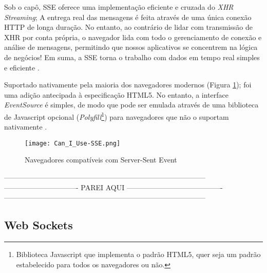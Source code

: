 \begin{citacao}
	Sob o capô, SSE oferece uma implementação eficiente e cruzada do \emph{XHR Streaming}; A entrega real das mensagens é feita através de uma única conexão HTTP de longa duração. No entanto, ao contrário de lidar com transmissão de XHR por conta própria, o navegador lida com todo o gerenciamento de conexão e análise de mensagens, permitindo que nossos aplicativos se concentrem na lógica de negócios! Em suma, a SSE torna o trabalho com dados em tempo real simples e eficiente \cite[P.~279]{grigorik2013high}.
\end{citacao}

Suportado nativamente pela maioria dos navegadores modernos (Figura \ref{fig:sse}); foi uma adição antecipada à especificação HTML5. No entanto, a interface \emph{EventSource} é simples, de modo que pode ser emulada através de uma biblioteca de Javascript opcional (\emph{Polyfill}\footnote{Biblioteca Javascript que implementa o padrão HTML5, quer seja um padrão estabelecido para todos os navegadores ou não.}) para navegadores que não o suportam nativamente \cite{grigorik2013high}.

\begin{figure}[!htb]
	\centering
	\texttt{[image: Can\_I\_Use-SSE.png]}
	\caption{Navegadores compatíveis com Server-Sent Event}
	\label{fig:sse}
\end{figure}

------------------------------------------------------------------------------------
------------------------------- PAREI AQUI ----------------------------------------
------------------------------------------------------------------------------------

\subsection{Web Sockets}

